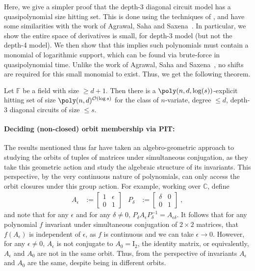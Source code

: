 \documentclass[letterpaper,11pt]{article}
\numberwithin{equation}{section}
\theoremstyle{plain}
\theoremstyle{remark}
\newcommand{\F}{\mathbb{F}}
\renewcommand{\C}{\mathbb{C}}
\newcommand{\Id}{\mathrm{I}}
\newcommand{\eqdef}{:=}
\renewcommand{\O}{\mathcal{O}}
\begin{document}
Here, we give a simpler proof that the depth-3 diagonal circuit model has a quasipolynomial size hitting set.  This is done using the techniques of \cite{ShpilkaVolkovich09}, and have some similarities with the work of Agrawal, Saha and Saxena~\cite{AgrawalSS12}.  In particular, we show the entire space of derivatives is small, for depth-3 model (but not the depth-4 model).  We then show that this implies such polynomials must contain a monomial of logarithmic support, which can be found via brute-force in quasipolynomial time.  Unlike the work of Agrawal, Saha and Saxena~\cite{AgrawalSS12}, no shifts are required for this small monomial to exist.  Thus, we get the following theorem.

\begin{theorem*}
	Let $\F$ be a field with size $\ge d+1$. Then there is a $\poly(n,d,\log(s))$-explicit hitting set of size $\poly(n,d)^{\O(\log s)}$ for the class of $n$-variate, degree $\le d$, depth-3 diagonal circuits of size $\le s$.
\end{theorem*}

\paragraph{Deciding (non-closed) orbit membership via PIT:} The results mentioned thus far have taken an algebro-geometric approach to studying the orbits of tuples of matrices under simultaneous conjugation, as they take this geometric action and study the algebraic structure of its invariants.  This perspective, by the very continuous nature of polynomials, can only access the orbit closures under this group action.  For example, working over $\C$, define
\begin{align*}
	A_\epsilon
	&\eqdef\begin{bmatrix}
		1&\epsilon\\
		0&1
	\end{bmatrix}
	&P_\delta
	&\eqdef\begin{bmatrix}
		\delta&0\\
		0&1
	\end{bmatrix}\;,
\end{align*}
and note that for any $\epsilon$ and for any $\delta\ne 0$, $P_\delta A_\epsilon P_\delta^{-1}=A_{\epsilon\delta}$.  It follows that for any polynomial $f$ invariant under simultaneous conjugation of $2\times 2$ matrices, that $f(A_\epsilon)$ is independent of $\epsilon$, as $f$ is continuous and we can take $\epsilon\to 0$.  However, for any $\epsilon\ne 0$, $A_\epsilon$ is not conjugate to $A_0=\Id_2$, the identity matrix, or equivalently, $A_\epsilon$ and $A_0$ are not in the same orbit.  Thus, from the perspective of invariants $A_\epsilon$ and $A_0$ are the same, despite being in different orbits.
\end{document}
